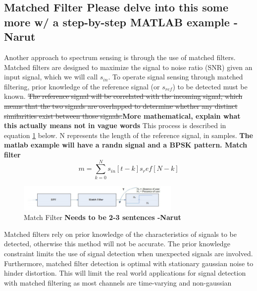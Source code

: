 \subsection{Matched Filter \textbf{Please delve into this some more w/ a step-by-step MATLAB example -Narut}}
Another approach to spectrum sensing is through the use of matched filters. Matched filters are designed to maximize the signal to noise ratio (SNR) given an input signal, which we will call $s_{in}$\cite{sensing_energy}. To operate signal sensing through matched filtering, prior knowledge of the reference signal (or $s_{ref}$) to be detected must be known. \sout{The reference signal will be correlated with the incoming signal, which means that the two signals are overlapped to determine whether any distinct similarities exist between those signals.}\textbf{More mathematical, explain what this actually means not in vague words} This process is described in equation \ref{fig:match_filter} below. N represents the length of the reference signal, in samples. 
\textbf{The matlab example will have a randn signal and a BPSK pattern. Match filter}
\[m = \sum_{k = 0}^{N}s_{in}[t-k]s_ref[N-k]\]
\begin{figure}[ht]
\centering
\includegraphics[width=0.70\textwidth]{img/match_filter.png}
\caption{Match Filter \textbf{Needs to be 2-3 sentences -Narut}}
\label{fig:match_filter}
\end{figure}\par
Matched filters rely on prior knowledge of the characteristics of signals to be detected, otherwise this method will not be accurate. The prior knowledge constraint limits the use of signal detection when unexpected signals are involved. Furthermore, matched filter detection is optimal with stationary gaussian noise to hinder distortion. This will limit the real world applications for signal detection with matched filtering as most channels are time-varying and non-gaussian\cite{channel_fade}\

